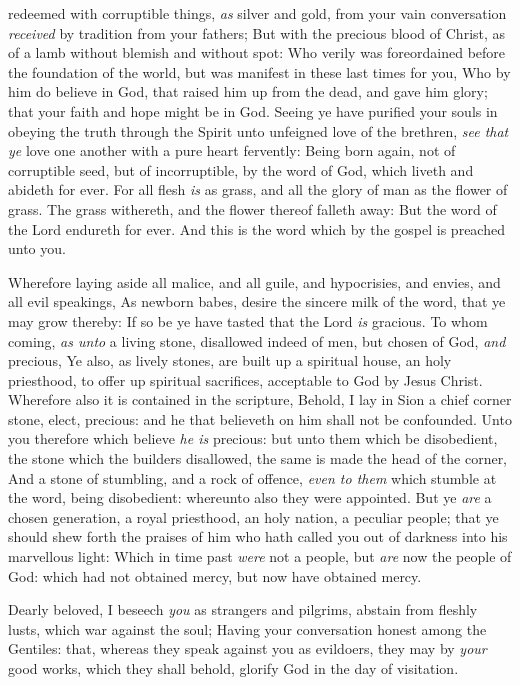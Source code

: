 \documentclass[11pt,letterpaper,oneside]{memoir}
\begin{document}
redeemed with corruptible things, \emph{as} silver and gold, from your
vain conversation \emph{received} by tradition from your fathers; But
with the precious blood of Christ, as of a lamb without blemish and
without spot: Who verily was foreordained before the foundation of the
world, but was manifest in these last times for you, Who by him do
believe in God, that raised him up from the dead, and gave him glory;
that your faith and hope might be in God. Seeing ye have purified your
souls in obeying the truth through the Spirit unto unfeigned love of the
brethren, \emph{see that ye} love one another with a pure heart
fervently: Being born again, not of corruptible seed, but of
incorruptible, by the word of God, which liveth and abideth for ever.
For all flesh \emph{is} as grass, and all the glory of man as the flower
of grass. The grass withereth, and the flower thereof falleth away: But
the word of the Lord endureth for ever. And this is the word which by
the gospel is preached unto you.

Wherefore laying aside all malice, and all guile, and hypocrisies, and
envies, and all evil speakings, As newborn babes, desire the sincere
milk of the word, that ye may grow thereby: If so be ye have tasted that
the Lord \emph{is} gracious. To whom coming, \emph{as unto} a living
stone, disallowed indeed of men, but chosen of God, \emph{and} precious,
Ye also, as lively stones, are built up a spiritual house, an holy
priesthood, to offer up spiritual sacrifices, acceptable to God by Jesus
Christ. Wherefore also it is contained in the scripture, Behold, I lay
in Sion a chief corner stone, elect, precious: and he that believeth on
him shall not be confounded. Unto you therefore which believe \emph{he
is} precious: but unto them which be disobedient, the stone which the
builders disallowed, the same is made the head of the corner, And a
stone of stumbling, and a rock of offence, \emph{even to them} which
stumble at the word, being disobedient: whereunto also they were
appointed. But ye \emph{are} a chosen generation, a royal priesthood, an
holy nation, a peculiar people; that ye should shew forth the praises of
him who hath called you out of darkness into his marvellous light: Which
in time past \emph{were} not a people, but \emph{are} now the people of
God: which had not obtained mercy, but now have obtained mercy.

Dearly beloved, I beseech \emph{you} as strangers and pilgrims, abstain
from fleshly lusts, which war against the soul; Having your conversation
honest among the Gentiles: that, whereas they speak against you as
evildoers, they may by \emph{your} good works, which they shall behold,
glorify God in the day of visitation.
\end{document}

